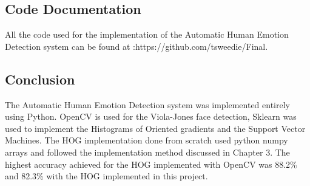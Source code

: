\subsection{Code Documentation}
All the code used for the implementation of the Automatic Human Emotion Detection system can be found at :https://github.com/tsweedie/Final.

\subsection{Conclusion}
The Automatic Human Emotion Detection system was implemented entirely using Python. OpenCV is used for the Viola-Jones face detection, Sklearn was used to implement the Histograms of Oriented gradients and the Support Vector Machines. The HOG implementation done from scratch used python numpy arrays and followed the implementation method discussed in Chapter 3. The highest accuracy achieved for the HOG implemented with OpenCV was 88.2\% and 82.3\% with the HOG implemented in this project.  

